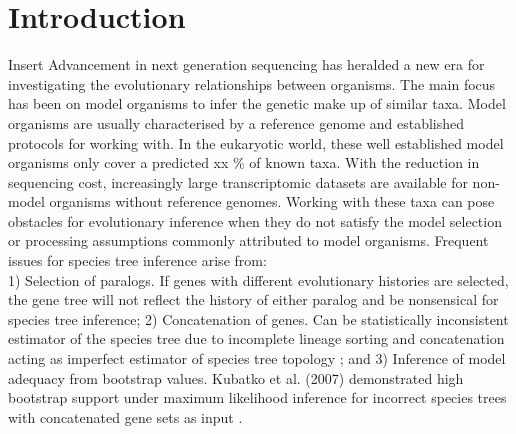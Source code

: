 \documentclass[12pt]{article}
\begin{document}
\section{Introduction}
Insert \cite{maddison1997gene} \cite{jeffroy2006phylogenomics}
Advancement in next generation sequencing has heralded a new era for investigating the evolutionary relationships between organisms. 
The main focus has been on model organisms to infer the genetic make up of similar taxa. 
Model organisms are usually characterised by a reference genome and established protocols for working with. 
In the eukaryotic world, these well established model organisms only cover a predicted xx \% of known taxa. 
With the reduction in sequencing cost, increasingly large transcriptomic datasets are available for non-model organisms without reference genomes. 
Working with these taxa can pose obstacles for evolutionary inference when they do not satisfy the model selection or processing assumptions commonly attributed to model organisms. Frequent issues for species tree inference arise from:\\
1) Selection of paralogs. If genes with different evolutionary histories are selected, the gene tree will not reflect the history of either paralog and be nonsensical for species tree inference; 
2) Concatenation of genes. Can be statistically inconsistent estimator of the species tree due to incomplete lineage sorting and concatenation acting as imperfect estimator of species tree topology \cite{roch2015likelihood}; and 
3) Inference of model adequacy from bootstrap values. Kubatko et al. (2007) demonstrated high bootstrap support under maximum likelihood inference for incorrect species trees with concatenated gene sets as input \cite{kubatko2007inconsistency}. 
\end{document}

